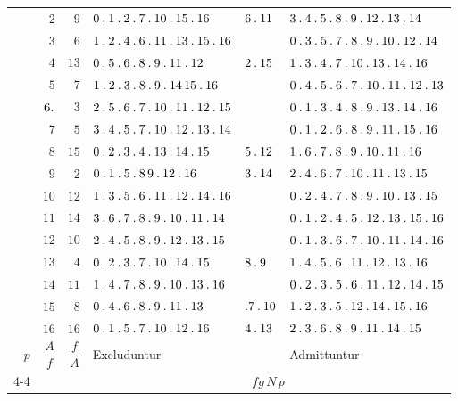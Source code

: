 \begin{longtable}{r|r|r|p{113pt}|p{29pt}|p{120pt}}
 & $2$ & $9$ & $0\pdot 1\pdot 2\pdot 7\pdot 10\pdot 15\pdot 16$ & $6\pdot 11$ & $3\pdot 4\pdot 5\pdot 8\pdot 9\pdot 12\pdot 13\pdot 14$\\
 & $3$ & $6$ & $1\pdot 2\pdot 4\pdot 6\pdot 11\pdot 13\pdot 15\pdot 16$ &  & $0\pdot 3\pdot 5\pdot 7\pdot 8\pdot 9\pdot 10\pdot 12\pdot 14$\\
 & $4$ & $13$ & $0\pdot 5\pdot 6\pdot 8\pdot 9\pdot 11\pdot 12$ & $2\pdot 15$ & $1\pdot 3\pdot 4\pdot 7\pdot 10\pdot 13\pdot 14\pdot 16$\\
 & $5$ & $7$ & $1\pdot 2\pdot 3\pdot 8\pdot 9\pdot 14\,15\pdot 16$ &  & $0\pdot 4\pdot 5\pdot 6\pdot 7\pdot 10\pdot 11\pdot 12\pdot 13$\\
 & $6\pdot $ & $3$ & $2\pdot 5\pdot 6\pdot 7\pdot 10\pdot 11\pdot 12\pdot 15$ &  & $0\pdot 1\pdot 3\pdot 4\pdot 8\pdot 9\pdot 13\pdot 14\pdot 16$\\
 & $7$ & $5$ & $3\pdot 4\pdot 5\pdot 7\pdot 10\pdot 12\pdot 13\pdot 14$ &  & $0\pdot 1\pdot 2\pdot 6\pdot 8\pdot 9\pdot 11\pdot 15\pdot 16$\\
 & $8$ & $15$ & $0\pdot 2\pdot 3\pdot 4\pdot 13\pdot 14\pdot 15$ & $5\pdot 12$ & $1\pdot 6\pdot 7\pdot 8\pdot 9\pdot 10\pdot 11\pdot 16$\\
 & $9$ & $2$ & $0\pdot 1\pdot 5\pdot 8\,9\pdot 12\pdot 16$ & $3\pdot 14$ & $2\pdot 4\pdot 6\pdot 7\pdot 10\pdot 11\pdot 13\pdot 15$\\
 & $10$ & $12$ & $1\pdot 3\pdot 5\pdot 6\pdot 11\pdot 12\pdot 14\pdot 16$ &  & $0\pdot 2\pdot 4\pdot 7\pdot 8\pdot 9\pdot 10\pdot 13\pdot 15$\\
 & $11$ & $14$ & $3\pdot 6\pdot 7\pdot 8\pdot 9\pdot 10\pdot 11\pdot 14$ &  & $0\pdot 1\pdot 2\pdot 4\pdot 5\pdot 12\pdot 13\pdot 15\pdot 16$\\
 & $12$ & $10$ & $2\pdot 4\pdot 5\pdot 8\pdot 9\pdot 12\pdot 13\pdot 15$ &  & $0\pdot 1\pdot 3\pdot 6\pdot 7\pdot 10\pdot 11\pdot 14\pdot 16$\\
 & $13$ & $4$ & $0\pdot 2\pdot 3\pdot 7\pdot 10\pdot 14\pdot 15$ & $8\pdot 9$ & $1\pdot 4\pdot 5\pdot 6\pdot 11\pdot 12\pdot 13\pdot 16$\\
 & $14$ & $11$ & $1\pdot 4\pdot 7\pdot 8\pdot 9\pdot 10\pdot 13\pdot 16$ &  & $0\pdot 2\pdot 3\pdot 5\pdot 6\pdot 11\pdot 12\pdot 14\pdot 15$\\
 & $15$ & $8$ & $0\pdot 4\pdot 6\pdot 8\pdot 9\pdot 11\pdot 13$ & $\pdot 7\pdot 10$ & $1\pdot 2\pdot 3\pdot 5\pdot 12\pdot 14\pdot 15\pdot 16$\\
 & $16$ & $16$ & $0\pdot 1\pdot 5\pdot 7\pdot 10\pdot 12\pdot 16$ & $4\pdot 13$ & $2\pdot 3\pdot 6\pdot 8\pdot 9\pdot 11\pdot 14\pdot 15$\\
\hline
$p$ & $\dfrac{A}{f}$ & $\dfrac{f}{A}$ & Excluduntur & & Admittuntur\\\cline{4-4}\cline{6-6}
& & & \multicolumn{3}{c}{$fg\,N\,p$}\\
\end{longtable}\endgroup

